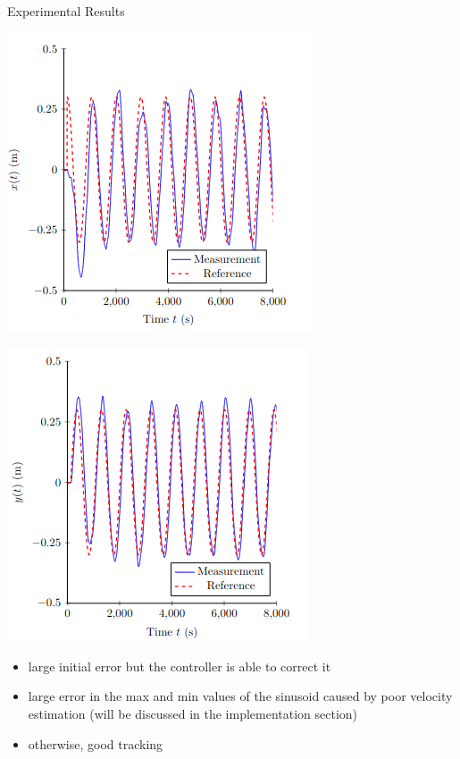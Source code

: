\begin{frame}{Experimental Results}
\begin{minipage}{0.45\textwidth}
        \centering
        \includegraphics[scale=0.45]{img/sbaiX.png}
    \end{minipage}\hfill
    \begin{minipage}{0.45\textwidth}
        \centering
        \includegraphics[scale=0.45]{img/sbaiY.png}
    \end{minipage}
    \begin{itemize}
        \item large initial error but the controller is able to correct it
        \item large error in the max and min values of the sinusoid caused by poor velocity estimation (will be discussed in the implementation section)
        \item otherwise, good tracking
    \end{itemize}
\end{frame}

